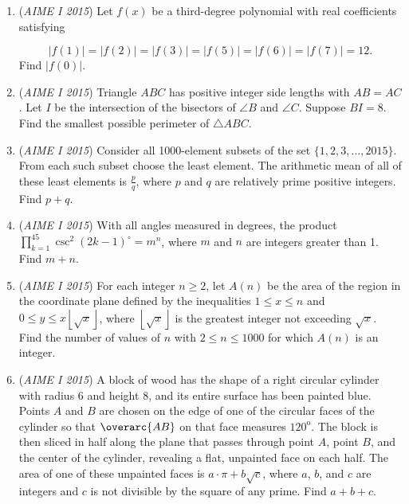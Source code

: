 \begin{enumerate}
 

	\item (\textit{AIME I 2015}) Let $f(x)$ be a third-degree polynomial with real coefficients satisfying

 \[|f(1)|=|f(2)|=|f(3)|=|f(5)|=|f(6)|=|f(7)|=12.\] Find $|f(0)|$.


 



 

	\item (\textit{AIME I 2015}) Triangle $ABC$ has positive integer side lengths with $AB=AC$. Let $I$ be the intersection of the bisectors of $\angle B$ and $\angle C$. Suppose $BI=8$. Find the smallest possible perimeter of $\triangle ABC$.


 



 

	\item (\textit{AIME I 2015}) Consider all 1000-element subsets of the set $\{ 1, 2, 3, ... , 2015 \}$.  From each such subset choose the least element.  The arithmetic mean of all of these least elements is $\frac{p}{q}$, where $p$ and $q$ are relatively prime positive integers.  Find $p + q$.


 



 

	\item (\textit{AIME I 2015}) With all angles measured in degrees, the product $\prod_{k=1}^{45} \csc^2(2k-1)^\circ=m^n$, where $m$ and $n$ are integers greater than 1. Find $m+n$.


 



 

	\item (\textit{AIME I 2015}) For each integer $n \ge 2$, let $A(n)$ be the area of the region in the coordinate plane defined by the inequalities $1\le x \le n$ and $0\le y \le x \left\lfloor \sqrt x \right\rfloor$, where $\left\lfloor \sqrt x \right\rfloor$ is the greatest integer not exceeding $\sqrt x$. Find the number of values of $n$ with $2\le n \le 1000$ for which $A(n)$ is an integer.


 



 

	\item (\textit{AIME I 2015}) A block of wood has the shape of a right circular cylinder with radius $6$ and height $8$, and its entire surface has been painted blue.  Points $A$ and $B$ are chosen on the edge of one of the circular faces of the cylinder so that $\overarc{AB}$ on that face measures $120^\text{o}$.  The block is then sliced in half along the plane that passes through point $A$, point $B$, and the center of the cylinder, revealing a flat, unpainted face on each half.  The area of one of these unpainted faces is $a\cdot\pi + b\sqrt{c}$, where $a$, $b$, and $c$ are integers and $c$ is not divisible by the square of any prime.  Find $a+b+c$.



\end{enumerate}
